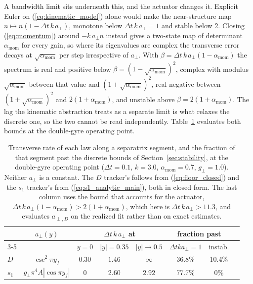 \documentclass[lettersize,journal]{IEEEtran}
\begin{document}
A bandwidth limit sits underneath this, and the actuator changes it.
Explicit Euler on (\ref{eq:kinematic_model}) alone would make the
near-structure map $n \mapsto n(1 - \Delta t\,k\,a_\perp)$, monotone
below $\Delta t\,k\,a_\perp = 1$ and stable below $2$. Closing
(\ref{eq:momentum}) around $-k\,a_\perp n$ instead gives a two-state map
of determinant $\alpha_{\text{mom}}$ for every gain, so where its
eigenvalues are complex the transverse error decays at
$\sqrt{\alpha_{\text{mom}}}$ per step irrespective of $a_\perp$. With
$\beta = \Delta t\,k\,a_\perp(1 - \alpha_{\text{mom}})$ the spectrum is
real and positive below $\beta = (1 - \sqrt{\alpha_{\text{mom}}})^2$,
complex with modulus $\sqrt{\alpha_{\text{mom}}}$ between that value and
$(1 + \sqrt{\alpha_{\text{mom}}})^2$, real negative between
$(1 + \sqrt{\alpha_{\text{mom}}})^2$ and $2(1 + \alpha_{\text{mom}})$, and
unstable above $\beta = 2(1 + \alpha_{\text{mom}})$. The lag the
kinematic abstraction treats as a separate limit is what relaxes the
discrete one, so the two cannot be read independently. Table~\ref{tab:bandwidth} evaluates both
bounds at the double-gyre operating point.
\begin{table}[!t]
\centering
\caption{Transverse rate of each law along a separatrix segment, and the
fraction of that segment past the discrete bounds of
Section~\ref{sec:stability}, at the double-gyre operating point
($\Delta t = 0.1$, $k = 3.0$,
$\alpha_{\text{mom}} = 0.7$, $g_\perp = 1.0$). Neither $a_\perp$ is a
constant. The $D$ tracker's follows from
(\ref{eq:floor_closed}) and the $s_1$ tracker's from
(\ref{eq:s1_analytic_main}), both in closed form. The last column uses
the bound that accounts for the actuator, $\Delta t\,k\,a_\perp
(1-\alpha_{\text{mom}}) > 2(1+\alpha_{\text{mom}})$, which here is
$\Delta t\,k\,a_\perp > 11.3$, and evaluates $a_{\perp,D}$ on the
realized fit rather than on exact estimates.}
\label{tab:bandwidth}
\footnotesize
\setlength{\tabcolsep}{3pt}
\begin{tabular}{@{}lccccccc@{}}
\hline
 & $a_\perp(y)$ & \multicolumn{3}{c}{$\Delta t\,k\,a_\perp$ at}
 & \multicolumn{2}{c}{fraction past} \\
\cline{3-5}\cline{6-7}
 & & $y\!=\!0$ & $|y|\!=\!0.35$ & $|y|\!\to\!0.5$
 & $\Delta t k a_\perp\!=\!1$ & instab. \\
\hline
$D$ & $\csc^2 \pi y_f$ & $0.30$ & $1.46$ & $\infty$ & 36.8\% & 10.4\% \\
$s_1$ & $g_\perp \pi^4 A |\cos \pi y_f|$ & $0$ & $2.60$ & $2.92$ & 77.7\% & 0\% \\
\hline
\end{tabular}
\end{table}
\end{document}
